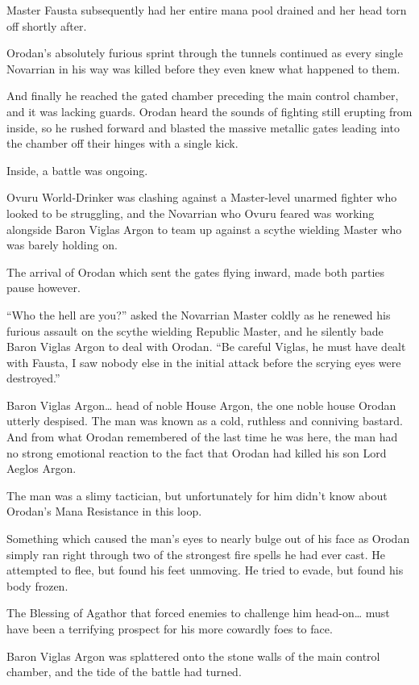 \documentclass[a4paper,10pt]{book}
\begin{document}
Master Fausta subsequently had her entire mana pool drained and her head torn off shortly after.\par
Orodan’s absolutely furious sprint through the tunnels continued as every single Novarrian in his way was killed before they even knew what happened to them.\par
And finally he reached the gated chamber preceding the main control chamber, and it was lacking guards. Orodan heard the sounds of fighting still erupting from inside, so he rushed forward and blasted the massive metallic gates leading into the chamber off their hinges with a single kick.\par
Inside, a battle was ongoing.\par
Ovuru World-Drinker was clashing against a Master-level unarmed fighter who looked to be struggling, and the Novarrian who Ovuru feared was working alongside Baron Viglas Argon to team up against a scythe wielding Master who was barely holding on.\par
The arrival of Orodan which sent the gates flying inward, made both parties pause however.\par
“Who the hell are you?” asked the Novarrian Master coldly as he renewed his furious assault on the scythe wielding Republic Master, and he silently bade Baron Viglas Argon to deal with Orodan. “Be careful Viglas, he must have dealt with Fausta, I saw nobody else in the initial attack before the scrying eyes were destroyed.”\par
Baron Viglas Argon… head of noble House Argon, the one noble house Orodan utterly despised. The man was known as a cold, ruthless and conniving bastard. And from what Orodan remembered of the last time he was here, the man had no strong emotional reaction to the fact that Orodan had killed his son Lord Aeglos Argon.\par
The man was a slimy tactician, but unfortunately for him didn’t know about Orodan’s Mana Resistance in this loop.\par
Something which caused the man’s eyes to nearly bulge out of his face as Orodan simply ran right through two of the strongest fire spells he had ever cast. He attempted to flee, but found his feet unmoving. He tried to evade, but found his body frozen.\par
The Blessing of Agathor that forced enemies to challenge him head-on… must have been a terrifying prospect for his more cowardly foes to face.\par
Baron Viglas Argon was splattered onto the stone walls of the main control chamber, and the tide of the battle had turned.\par
\end{document}
